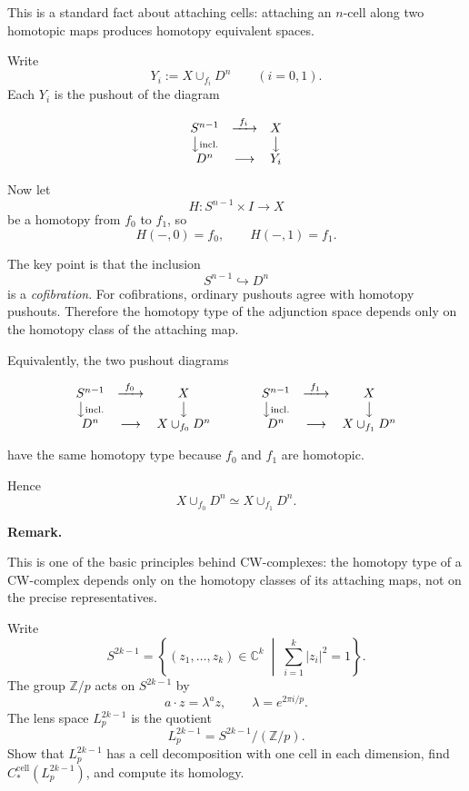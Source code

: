 \begin{solution}
This is a standard fact about attaching cells: attaching an \(n\)-cell along two homotopic maps produces homotopy equivalent spaces.

Write
\[
Y_i:=X\cup_{f_i}D^n \qquad (i=0,1).
\]
Each \(Y_i\) is the pushout of the diagram


\[
\begin{array}{ccc}
S^{n-1} & \xrightarrow{\ f_i\ } & X\\
\big\downarrow{\scriptstyle \mathrm{incl.}} && \big\downarrow\\
D^n & \longrightarrow & Y_i
\end{array}
\]



Now let
\[
H:S^{n-1}\times I \to X
\]
be a homotopy from \(f_0\) to \(f_1\), so
\[
H(-,0)=f_0,\qquad H(-,1)=f_1.
\]

The key point is that the inclusion
\[
S^{n-1}\hookrightarrow D^n
\]
is a \emph{cofibration}. For cofibrations, ordinary pushouts agree with homotopy pushouts. Therefore the homotopy type of the adjunction space depends only on the homotopy class of the attaching map.

Equivalently, the two pushout diagrams


\[
\begin{array}{ccc@{\qquad\qquad}ccc}
S^{n-1} & \xrightarrow{\ f_0\ } & X
&
S^{n-1} & \xrightarrow{\ f_1\ } & X\\
\big\downarrow{\scriptstyle \mathrm{incl.}} && \big\downarrow
&
\big\downarrow{\scriptstyle \mathrm{incl.}} && \big\downarrow\\
D^n & \longrightarrow & X\cup_{f_0}D^n
&
D^n & \longrightarrow & X\cup_{f_1}D^n
\end{array}
\]


have the same homotopy type because \(f_0\) and \(f_1\) are homotopic.

Hence
\[
X\cup_{f_0}D^n \simeq X\cup_{f_1}D^n.
\]


\medskip
\noindent\textbf{Remark.}\par
\smallskip

This is one of the basic principles behind CW-complexes: the homotopy type of a CW-complex depends only on the homotopy classes of its attaching maps, not on the precise representatives.

\par
\end{solution}

\begin{problem}
Write
\[
S^{2k-1}=\left\{(z_1,\dots,z_k)\in \mathbb C^k \;\middle|\; \sum_{i=1}^k |z_i|^2=1\right\}.
\]
The group \(\mathbb Z/p\) acts on \(S^{2k-1}\) by
\[
a\cdot z=\lambda^a z,\qquad \lambda=e^{2\pi i/p}.
\]
The lens space \(L_p^{2k-1}\) is the quotient
\[
L_p^{2k-1}=S^{2k-1}/(\mathbb Z/p).
\]
Show that \(L_p^{2k-1}\) has a cell decomposition with one cell in each dimension, find \(C_*^{\mathrm{cell}}(L_p^{2k-1})\), and compute its homology.
\end{problem}

